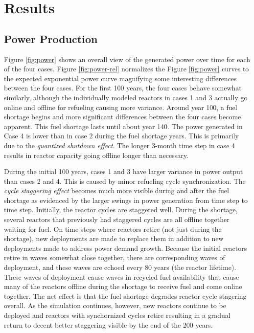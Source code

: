 \documentclass{style}
\begin{document}
\section{Results}

\subsection{Power Production}

Figure \ref{fig:power} shows an overall view of the generated
power over time for each of the four cases.  Figure
\ref{fig:power-rel} normalizes the Figure
\ref{fig:power} curves to the expected exponential power curve
magnifying some interesting differences between the four cases.  For the first
100 years, the four cases behave somewhat similarly, although the individually
modeled reactors in cases 1 and 3 actually go online and offline for refueling
causing more variance.  Around year 100, a fuel shortage begins and more
significant differences between the four cases become apparent. This fuel
shortage lasts until about year 140. The power generated in Case 4 is lower
than in case 2 during the fuel shortage years. This is primarily due to the
\emph{quantized shutdown effect}.  The longer 3-month time step in case 4
results in reactor capacity going offline longer than necessary.

During the initial 100 years, cases 1 and 3 have larger variance in power
output than cases 2 and 4.  This is caused by minor refueling cycle
synchronization.  The \emph{cycle staggering effect} becomes much more visible
during and after the fuel shortage as evidenced by the larger swings in power
generation from time step to time step.  Initially, the reactor cycles are
staggered well.  During the shortage, several reactors that previously had
staggered cycles are all offline together waiting for fuel.  On time steps
where reactors retire (not just during the shortage), new deployments are made
to replace them in addition to new deployments made to address power demand
growth.  Because the initial reactors retire in waves somewhat close together,
there are corresponding waves of deployment, and these waves are echoed every
80 years (the reactor lifetime).  These waves of deployment cause waves in
recycled fuel availability that cause many of the reactors offline during the
shortage to receive fuel and come online together.  The net effect is that the
fuel shortage degrades reactor cycle stagering overall.  As the simulation
continues, however, new reactors continue to be deployed and reactors with
synchornized cycles retire resulting in a gradual return to decent better
staggering visible by the end of the 200 years.
\end{document}

